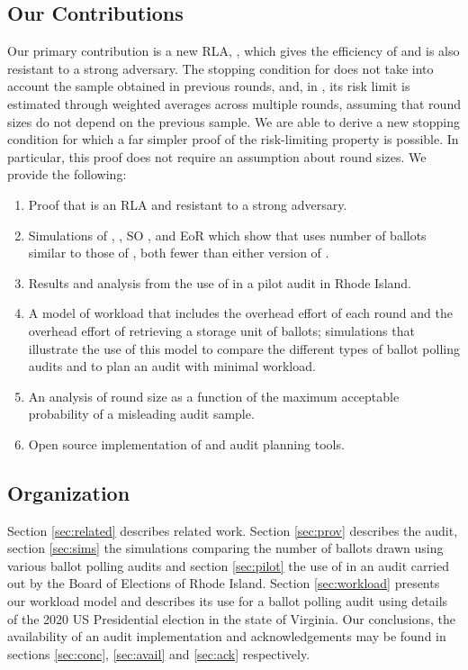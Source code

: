 \subsection{Our Contributions}
Our primary contribution is a new RLA, \Providence, which gives the efficiency of \Minerva and is also resistant to a strong adversary. The stopping condition for \Minerva does not take into account the sample obtained in previous rounds, and, in \cite{usenix_minerva}, its risk limit is estimated through weighted averages across multiple rounds, assuming that round sizes do not depend on the previous sample. We are able to derive a new stopping condition for which a far simpler proof of the risk-limiting property is possible. In particular, this proof does not require an assumption about round sizes. We provide the following:
\begin{enumerate}
\item Proof that \Providence is an RLA and resistant to a strong adversary.
\item Simulations of \Providence, \Minerva, SO \BRAVO, and EoR \BRAVO which show that \Providence uses number of ballots similar to those of \Minerva, both fewer than either version of \BRAVO.
\item Results and analysis from the use of \Providence in a pilot audit in Rhode Island.
\item A model of workload that includes the overhead effort of each round and the overhead effort of retrieving a storage unit of ballots; simulations that illustrate the use of this model to compare the different types of ballot polling audits and to plan an audit with minimal workload.
\item An analysis of round size as a function of the maximum acceptable probability of a misleading audit sample.
\item Open source implementation of \Providence and audit planning tools. 
\end{enumerate}


\subsection{Organization} 
Section \ref{sec:related} describes related work. Section \ref{sec:prov} describes the \Providence audit, section \ref{sec:sims} the simulations comparing the number of ballots drawn using various ballot polling audits and section \ref{sec:pilot} the use of \Providence in an audit carried out by the Board of Elections of Rhode Island. Section \ref{sec:workload} presents our workload model and describes its use for a ballot polling audit using details of the 2020 US Presidential election in the state of Virginia. Our conclusions, the availability of an audit implementation and acknowledgements may be found in sections \ref{sec:conc}, \ref{sec:avail} and \ref{sec:ack} respectively. 

